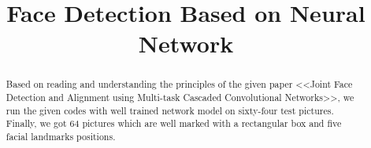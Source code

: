 \documentclass[journal, a4paper]{IEEEtran}
\begin{document}
	\title{Face Detection Based on Neural Network}
	\maketitle

\begin{abstract}
Based on reading and understanding the principles of the given paper <<Joint Face Detection and Alignment using Multi-task Cascaded Convolutional Networks>>, we run the given codes with well trained network model on sixty-four test pictures. Finally, we got 64 pictures which are well marked with a rectangular box and five facial landmarks positions.
\end{abstract}

\end{document}
